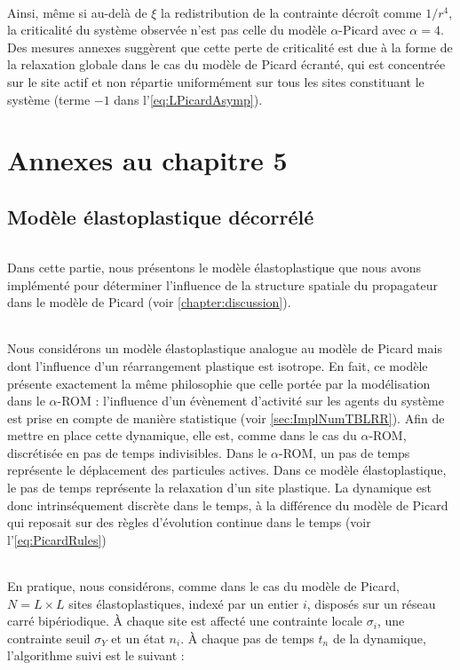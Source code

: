 \subparagraph{}Ainsi, même si au-delà de $\xi$ la redistribution de la contrainte décroît comme $1/r^4$, la criticalité du système observée n'est pas celle du modèle $\alpha$-Picard avec $\alpha = 4$. Des mesures annexes suggèrent que cette perte de criticalité est due à la forme de la relaxation globale dans le cas du modèle de Picard écranté, qui est concentrée sur le site actif et non répartie uniformément sur tous les sites constituant le système (terme $-1$ dans l'\autoref{eq:LPicardAsymp}).

\chapter{Annexes au chapitre 5}

\section{Modèle élastoplastique décorrélé}

\label{sec:EPMdiscret}

\subparagraph{}Dans cette partie, nous présentons le modèle élastoplastique que nous avons implémenté pour déterminer l'influence de la structure spatiale du propagateur dans le modèle de Picard (voir \autoref{chapter:discussion}).

\subparagraph{}Nous considérons un modèle élastoplastique analogue au modèle de Picard mais dont l'influence d'un réarrangement plastique est isotrope. En fait, ce modèle présente exactement la même philosophie que celle portée par la modélisation dans le $\alpha$-ROM : l'influence d'un évènement d'activité sur les agents du système est prise en compte de manière statistique (voir \autoref{sec:ImplNumTBLRR}). Afin de mettre en place cette dynamique, elle est, comme dans le cas du $\alpha$-ROM, discrétisée en pas de temps indivisibles. Dans le $\alpha$-ROM, un pas de temps représente le déplacement des particules actives. Dans ce modèle élastoplastique, le pas de temps représente la relaxation d'un site plastique. La dynamique est donc intrinséquement discrète dans le temps, à la différence du modèle de Picard qui reposait sur des règles d'évolution continue dans le temps (voir l'\autoref{eq:PicardRules})

\subparagraph{}En pratique, nous considérons, comme dans le cas du modèle de Picard, $N = L\times L$ sites élastoplastiques, indexé par un entier $i$, disposés sur un réseau carré bipériodique. \`A chaque site est affecté une contrainte locale $\sigma_i$, une contrainte seuil $\sigma_Y$ et un état $n_i$. \`A chaque pas de temps $t_n$ de la dynamique, l'algorithme suivi est le suivant :

